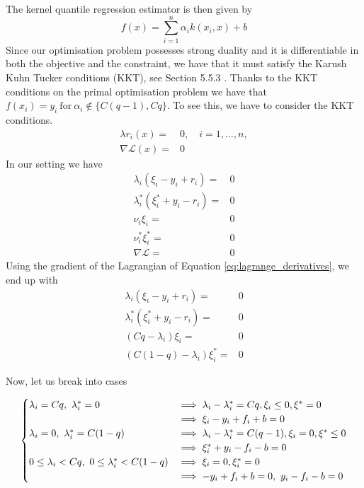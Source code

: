 The kernel quantile regression estimator is then given by
\begin{equation}
    f(x)=\sum\limits_{i=1}^{n} \alpha_i k(x_i, x)+b
\end{equation}
Since our optimisation problem possesses strong duality and it is differentiable in both the objective and the constraint, we have that it must satisfy the Karush Kuhn Tucker conditions (KKT), see Section 5.5.3 \cite{boyd2004convex}.
Thanks to the KKT conditions on the primal optimisation problem we have that $f(x_i)=y_i \ \mathrm{for} \ \alpha_i \not \in \{C(q-1), Cq\}$. 
To see this, we have to consider the KKT conditions.
\begin{equation}
    \begin{aligned}
    \lambda r_i(x)=&0, \quad i=1,\dots,n,
    \\
    \nabla \mathcal{L}(x)=&0
\end{aligned}
\end{equation}
In our setting we have
\begin{equation}
    \begin{aligned}
        \lambda_i(\xi_i-y_i+r_i)=&0
        \\
        \lambda_i^*(\xi_i^*+y_i-r_i)=&0
        \\
        \nu_i \xi_i=&0
        \\
        \nu_i^* \xi_i^*=&0
        \\
        \nabla \mathcal{L} =&0
    \end{aligned}
\end{equation}
Using the gradient of the Lagrangian of Equation \ref{eq:lagrange_derivatives}, we end up with
\begin{equation}
    \begin{aligned}
        \lambda_i(\xi_i-y_i+r_i)=&0
        \\
        \lambda_i^*(\xi_i^*+y_i-r_i)=&0
        \\
        (Cq-\lambda_i) \xi_i=&0
        \\
        (C(1-q)-\lambda_i) \xi_i^*=&0
    \end{aligned}
\end{equation}

Now, let us break into cases

\begin{equation}
\begin{cases}
    \lambda_i=Cq, \ \lambda_i^*=0 & 
    \hbox{$\implies \lambda_i-\lambda_i^*=Cq, \xi_i\leq 0, \xi^*=0$}
    \\
    &
    \hbox{$\implies \xi_i-y_i+f_i+b=0$}
    \\
    \lambda_i=0, \ \lambda_i^*=C(1-q) & 
    \hbox{$\implies \lambda_i-\lambda_i^*=C(q-1), \xi_i= 0, \xi^*\leq 0$} 
    \\
    & \hbox{$ \implies \xi_i^*+y_i-f_i-b=0$}
    \\
    0\leq \lambda_i< Cq, \ 0\leq \lambda_i^*< C(1-q) & 
    \hbox{$\implies \xi_i=0,  \xi^*_i= 0$}
    \\
    & \hbox{$\implies -y_i+f_i+b=0, \ y_i-f_i-b=0$} \\
\end{cases}
\end{equation}

